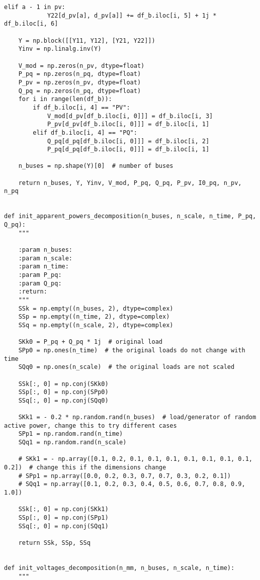 \begin{lstlisting}[caption={Proper Generalized Decomposition code in Python}]
        elif a - 1 in pv:
            Y22[d_pv[a], d_pv[a]] += df_b.iloc[i, 5] + 1j * df_b.iloc[i, 6]

    Y = np.block([[Y11, Y12], [Y21, Y22]])
    Yinv = np.linalg.inv(Y)

    V_mod = np.zeros(n_pv, dtype=float)
    P_pq = np.zeros(n_pq, dtype=float)
    P_pv = np.zeros(n_pv, dtype=float)
    Q_pq = np.zeros(n_pq, dtype=float)
    for i in range(len(df_b)):
        if df_b.iloc[i, 4] == "PV":
            V_mod[d_pv[df_b.iloc[i, 0]]] = df_b.iloc[i, 3]
            P_pv[d_pv[df_b.iloc[i, 0]]] = df_b.iloc[i, 1]
        elif df_b.iloc[i, 4] == "PQ":
            Q_pq[d_pq[df_b.iloc[i, 0]]] = df_b.iloc[i, 2]
            P_pq[d_pq[df_b.iloc[i, 0]]] = df_b.iloc[i, 1]

    n_buses = np.shape(Y)[0]  # number of buses

    return n_buses, Y, Yinv, V_mod, P_pq, Q_pq, P_pv, I0_pq, n_pv, n_pq


def init_apparent_powers_decomposition(n_buses, n_scale, n_time, P_pq, Q_pq):
    """

    :param n_buses:
    :param n_scale:
    :param n_time:
    :param P_pq:
    :param Q_pq:
    :return:
    """
    SSk = np.empty((n_buses, 2), dtype=complex)
    SSp = np.empty((n_time, 2), dtype=complex)
    SSq = np.empty((n_scale, 2), dtype=complex)

    SKk0 = P_pq + Q_pq * 1j  # original load
    SPp0 = np.ones(n_time)  # the original loads do not change with time
    SQq0 = np.ones(n_scale)  # the original loads are not scaled

    SSk[:, 0] = np.conj(SKk0)
    SSp[:, 0] = np.conj(SPp0)
    SSq[:, 0] = np.conj(SQq0)

    SKk1 = - 0.2 * np.random.rand(n_buses)  # load/generator of random active power, change this to try different cases
    SPp1 = np.random.rand(n_time)
    SQq1 = np.random.rand(n_scale)

    # SKk1 = - np.array([0.1, 0.2, 0.1, 0.1, 0.1, 0.1, 0.1, 0.1, 0.1, 0.2])  # change this if the dimensions change
    # SPp1 = np.array([0.0, 0.2, 0.3, 0.7, 0.7, 0.3, 0.2, 0.1])
    # SQq1 = np.array([0.1, 0.2, 0.3, 0.4, 0.5, 0.6, 0.7, 0.8, 0.9, 1.0])

    SSk[:, 0] = np.conj(SKk1)
    SSp[:, 0] = np.conj(SPp1)
    SSq[:, 0] = np.conj(SQq1)

    return SSk, SSp, SSq


def init_voltages_decomposition(n_mm, n_buses, n_scale, n_time):
    """


\end{lstlisting}
